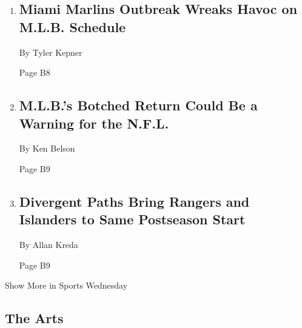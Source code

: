 \begin{enumerate}
\def\labelenumi{\arabic{enumi}.}
\item
  \href{/2020/07/28/sports/baseball/marlins-outbreak-mlb-coronavirus.html}{}

  \hypertarget{miami-marlins-outbreak-wreaks-havoc-on-mlb-schedule-1}{%
  \subsection{Miami Marlins Outbreak Wreaks Havoc on M.L.B.
  Schedule}\label{miami-marlins-outbreak-wreaks-havoc-on-mlb-schedule-1}}

  By Tyler Kepner

  Page B8
\item
  \href{/2020/07/29/sports/football/nfl-mlb-opting-out.html}{}

  \hypertarget{mlbs-botched-return-could-be-a-warning-for-the-nfl}{%
  \subsection{M.L.B.'s Botched Return Could Be a Warning for the
  N.F.L.}\label{mlbs-botched-return-could-be-a-warning-for-the-nfl}}

  By Ken Belson

  Page B9
\item
  \href{/2020/07/29/sports/hockey/new-york-rangers-islanders-playoffs.html}{}

  \hypertarget{divergent-paths-bring-rangers-and-islanders-to-same-postseason-start}{%
  \subsection{Divergent Paths Bring Rangers and Islanders to Same
  Postseason
  Start}\label{divergent-paths-bring-rangers-and-islanders-to-same-postseason-start}}

  By Allan Kreda

  Page B9
\end{enumerate}

Show More in Sports Wednesday

\hypertarget{the-arts}{%
\subsection{The Arts}\label{the-arts}}

